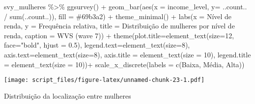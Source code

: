 \documentclass[
]{article}
\newenvironment{Shaded}{\begin{snugshade}}{\end{snugshade}}
\newcommand{\AttributeTok}[1]{\textcolor[rgb]{0.77,0.63,0.00}{#1}}
\newcommand{\DecValTok}[1]{\textcolor[rgb]{0.00,0.00,0.81}{#1}}
\newcommand{\FloatTok}[1]{\textcolor[rgb]{0.00,0.00,0.81}{#1}}
\newcommand{\FunctionTok}[1]{\textcolor[rgb]{0.00,0.00,0.00}{#1}}
\newcommand{\NormalTok}[1]{#1}
\newcommand{\SpecialCharTok}[1]{\textcolor[rgb]{0.00,0.00,0.00}{#1}}
\newcommand{\StringTok}[1]{\textcolor[rgb]{0.31,0.60,0.02}{#1}}
\begin{document}
\begin{Shaded}
\begin{Highlighting}[]
\NormalTok{svy\_mulheres }\SpecialCharTok{\%\textgreater{}\%}
  \FunctionTok{ggsurvey}\NormalTok{() }\SpecialCharTok{+}
  \FunctionTok{geom\_bar}\NormalTok{(}\FunctionTok{aes}\NormalTok{(}\AttributeTok{x =}\NormalTok{ income\_level, }\AttributeTok{y=}\NormalTok{ ..count.. }\SpecialCharTok{/} \FunctionTok{sum}\NormalTok{(..count..)), }\AttributeTok{fill =} \StringTok{\textquotesingle{}\#69b3a2\textquotesingle{}}\NormalTok{) }\SpecialCharTok{+}
  \FunctionTok{theme\_minimal}\NormalTok{() }\SpecialCharTok{+}
  \FunctionTok{labs}\NormalTok{(}\AttributeTok{x =} \StringTok{\textquotesingle{}Nível de renda\textquotesingle{}}\NormalTok{,}
       \AttributeTok{y =} \StringTok{\textquotesingle{}Frequência relativa\textquotesingle{}}\NormalTok{,}
       \AttributeTok{title =} \StringTok{\textquotesingle{}Distribuição de mulheres por nível de renda\textquotesingle{}}\NormalTok{,}
       \AttributeTok{caption =} \StringTok{\textquotesingle{}WVS (wave 7)\textquotesingle{}}\NormalTok{) }\SpecialCharTok{+}
  \FunctionTok{theme}\NormalTok{(}\AttributeTok{plot.title=}\FunctionTok{element\_text}\NormalTok{(}\AttributeTok{size=}\DecValTok{12}\NormalTok{, }\AttributeTok{face=}\StringTok{"bold"}\NormalTok{, }\AttributeTok{hjust =} \FloatTok{0.5}\NormalTok{),}
        \AttributeTok{legend.text=}\FunctionTok{element\_text}\NormalTok{(}\AttributeTok{size=}\DecValTok{8}\NormalTok{),}
        \AttributeTok{axis.text=}\FunctionTok{element\_text}\NormalTok{(}\AttributeTok{size=}\DecValTok{8}\NormalTok{),}
        \AttributeTok{axis.title =} \FunctionTok{element\_text}\NormalTok{(}\AttributeTok{size =} \DecValTok{10}\NormalTok{),}
        \AttributeTok{legend.title =} \FunctionTok{element\_text}\NormalTok{(}\AttributeTok{size =} \DecValTok{10}\NormalTok{))}\SpecialCharTok{+}
  \FunctionTok{scale\_x\_discrete}\NormalTok{(}\AttributeTok{labels =} \FunctionTok{c}\NormalTok{(}\StringTok{\textquotesingle{}Baixa\textquotesingle{}}\NormalTok{, }\StringTok{\textquotesingle{}Média\textquotesingle{}}\NormalTok{, }\StringTok{\textquotesingle{}Alta\textquotesingle{}}\NormalTok{))}
\end{Highlighting}
\end{Shaded}

\texttt{[image: script\_files/figure-latex/unnamed-chunk-23-1.pdf]}

Distribuição da localização entre mulheres
\end{document}
